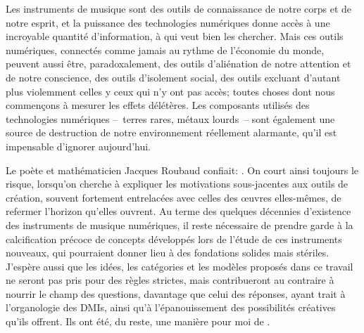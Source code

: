 Les instruments de musique sont des outils de connaissance de notre corps et de notre esprit, et la puissance des technologies numériques donne accès à une incroyable quantité d'information, à qui veut bien les chercher. Mais ces outils numériques, connectés comme jamais au rythme de l'économie du monde, peuvent aussi être, paradoxalement, des outils d'aliénation de notre attention et de notre conscience, des outils d'isolement social, des outils excluant d'autant plus violemment celles y ceux qui n'y ont pas accès; toutes choses dont nous commençons à mesurer les effets délétères. Les composants utilisés des technologies numériques --~terres rares, métaux lourds~-- sont également une source de destruction de notre environnement réellement alarmante, qu'il est impensable d'ignorer aujourd'hui.




\noindent Le poète et mathématicien Jacques Roubaud confiait: . On court ainsi toujours le risque, lorsqu'on cherche à expliquer les motivations sous-jacentes aux outils de création, souvent fortement entrelacées avec celles des œuvres elles-mêmes, de refermer l'horizon qu'elles ouvrent. Au terme des quelques décennies d'existence des instruments de musique numériques, il reste nécessaire de prendre garde à la calcification précoce de concepts développés lors de l'étude de ces instruments nouveaux, qui pourraient donner lieu à des fondations solides mais stériles. J'espère aussi que les idées, les catégories et les modèles proposés dans ce travail ne seront pas pris pour des règles strictes, mais contribueront au contraire à nourrir le champ des questions, davantage que celui des réponses, ayant trait à l'organologie des \glspl{DMI}, ainsi qu'à l'épanouissement des possibilités créatives qu'ils offrent. Ils ont été, du reste, une manière pour moi de .


